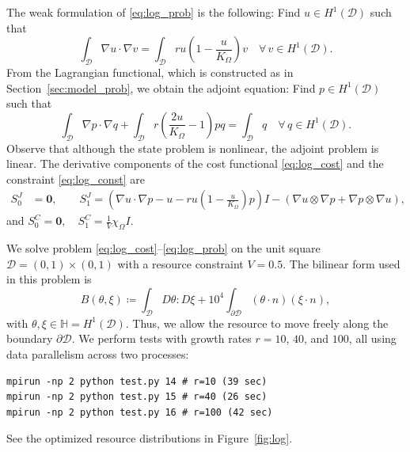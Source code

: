 \documentclass[preprint,9pt]{elsarticle}
\begin{document}
The weak formulation of \eqref{eq:log_prob} is the following:
Find $u\in H^1(\mathcal{D})$ such that
\begin{equation}\label{eq:log_weak}
	\int_{\mathcal{D}}\nabla u \cdot \nabla v =
	\int_{\mathcal{D}}ru\left(1-\frac{u}{K_{\Omega}}\right)v
	\quad
	\forall \, v \in  H^1(\mathcal{D}).
\end{equation}
From the Lagrangian functional, which is constructed as in
Section~\ref{sec:model_prob}, we obtain the adjoint equation:
Find $p\in H^1(\mathcal{D})$ such that
\[
	\int_{\mathcal{D}}\nabla p \cdot \nabla q +
	\int_{\mathcal{D}}r\left(\frac{2u}{K_{\Omega}}-1\right)pq = 
	\int_{\mathcal{D}}q
	\quad
	\forall \, q \in H^1(\mathcal{D}).
\]
Observe that although the state problem is nonlinear,
the adjoint problem is linear.
The derivative components of the cost functional \eqref{eq:log_cost} and
the constraint \eqref{eq:log_const} are
\[
\begin{aligned}
	S^J_0 &= \boldsymbol{0},\qquad
	S^J_1 = \left(
				\nabla u\cdot\nabla p-u-ru\left(1-\frac{u}{K_{\Omega}}\right)p
			\right)I
		-(\nabla u\otimes\nabla p+\nabla p\otimes\nabla u),
\end{aligned}
\]
and
$
	S_0^C =\boldsymbol{0},
	\quad
	S_1^C =\frac{1}{V}\chi_{\Omega}I.
$

\begin{example}\label{ex:log}
We solve problem \eqref{eq:log_cost}--\eqref{eq:log_prob}
on the unit square $\mathcal{D} = (0,1)\times(0,1)$
with a resource constraint $V=0.5$. The bilinear form used in this problem is
\[
	B(\theta, \xi) \coloneqq
	\int_{\mathcal{D}} D\theta \colon\! D\xi +
	{10}^4 \int_{\partial \mathcal{D}}(\theta \cdot n) (\xi \cdot n),	
\]
with $\theta,\xi\in\mathbb{H}=H^1(\mathcal{D})$.
Thus, we allow the resource to move freely along
the boundary $\partial\mathcal{D}$.
We perform tests with growth rates $r = 10$, $40$, and $100$,
all using data parallelism across two processes:
\begin{lstlisting}
mpirun -np 2 python test.py 14 # r=10 (39 sec)
mpirun -np 2 python test.py 15 # r=40 (26 sec)
mpirun -np 2 python test.py 16 # r=100 (42 sec)
\end{lstlisting}
See the optimized resource distributions in Figure~\ref{fig:log}.
\end{example}
\end{document}
